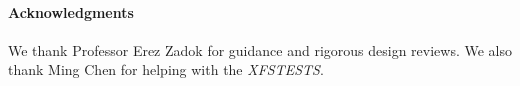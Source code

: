 \paragraph{Acknowledgments}
\label{ack}

%
%
%
%
%

We thank Professor Erez Zadok for guidance and rigorous design reviews.
We also thank Ming Chen for helping with the \emph{XFSTESTS}.

